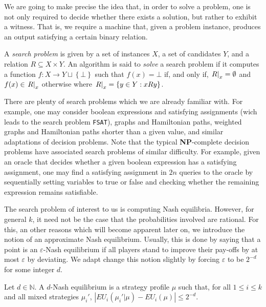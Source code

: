 \documentclass{article}
\begin{document}
We are going to make precise the idea that, in order to solve
a problem, one is not only required to decide whether there exists
a solution, but rather to exhibit a witness. That is, we require a
machine that, given a problem instance, produces an output satisfying
a certain binary relation.

\begin{definition}
  A \emph{search problem} is given by a set of instances $X$,
  a set of candidates $Y$, and a relation $R\subseteq X\times Y$.
  An algorithm is said to \emph{solve} a search problem if
  it computes a function $f:X\to Y\sqcup\left\lbrace{\bot}\right\rbrace$
  such that $f(x) = \bot$ if, and only if, $\left.{R}\right\vert_{x} = \emptyset$
  and $f(x)\in\left.{R}\right\vert_{x}$ otherwise where
  $\left.{R}\right\vert_{x} = \left\lbrace{y\in Y: xRy}\right\rbrace$.
\end{definition}

There are plenty of search problems which we are already familiar with.
For example, one may consider boolean expressions and satisfying assignments
(wich leads to the search problem \texttt{FSAT}),
graphs and Hamiltonian paths, weighted graphs and Hamiltonian paths shorter
than a given value, and similar adaptations of decision problems. Note that the
typical \textbf{NP}-complete decision problems have associated search problems
of similar difficulty. For example, given an oracle that decides whether a
given boolean expression has a satisfying assignment, one may find a satisfying
assignment in $2n$ queries to the oracle by sequentially setting variables to
true or false and checking whether the remaining expression remains
satisfiable. \cite{goldberg2022}

The search problem of interest to us is computing Nash equilibria. However, for
general $k$, it need not be the case that the probabilities involved are
rational. For this, an other reasons which will become apparent later on, we
introduce the notion of an approximate Nash equilibrium. Usually, this is done
by saying that a point is an $\varepsilon$-Nash equilibrium if all players
stand to improve their pay-offs by at most $\varepsilon$ by deviating. We adapt
change this notion slightly by forcing $\varepsilon$ to be $2^{-d}$ for some
integer $d$.

\begin{definition}
  Let $d\in\mathbb{N}$. A $d$-Nash equilibrium is a strategy profile
  $\mu$ such that, for all $1\leq i\leq k$ and all mixed strategies
  $\mu_i'$, $\left\vert{EU_i(\mu_i' | \mu) - EU_i(\mu)}\right\vert\leq 2^{-d}$.
\end{definition}
\end{document}
